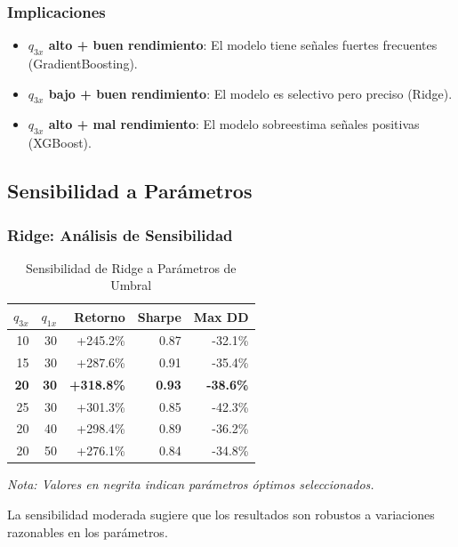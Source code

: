 \subsubsection{Implicaciones}

\begin{itemize}
    \item \textbf{$q_{3x}$ alto + buen rendimiento}: El modelo tiene se\~nales fuertes frecuentes (GradientBoosting).
    \item \textbf{$q_{3x}$ bajo + buen rendimiento}: El modelo es selectivo pero preciso (Ridge).
    \item \textbf{$q_{3x}$ alto + mal rendimiento}: El modelo sobreestima se\~nales positivas (XGBoost).
\end{itemize}

\subsection{Sensibilidad a Par\'ametros}
\label{app:param_sensitivity}

\subsubsection{Ridge: An\'alisis de Sensibilidad}

\begin{table}[htbp]
\centering
\caption{Sensibilidad de Ridge a Par\'ametros de Umbral}
\label{tab:ridge_sensitivity}
\small
\begin{tabular}{@{}rrrrr@{}}
\toprule
\textbf{$q_{3x}$} & \textbf{$q_{1x}$} & \textbf{Retorno} & \textbf{Sharpe} & \textbf{Max DD} \\
\midrule
10 & 30 & +245.2\% & 0.87 & -32.1\% \\
15 & 30 & +287.6\% & 0.91 & -35.4\% \\
\textbf{20} & \textbf{30} & \textbf{+318.8\%} & \textbf{0.93} & \textbf{-38.6\%} \\
25 & 30 & +301.3\% & 0.85 & -42.3\% \\
20 & 40 & +298.4\% & 0.89 & -36.2\% \\
20 & 50 & +276.1\% & 0.84 & -34.8\% \\
\bottomrule
\end{tabular}

\vspace{0.2cm}
\small\textit{Nota: Valores en negrita indican par\'ametros \'optimos seleccionados.}
\end{table}

La sensibilidad moderada sugiere que los resultados son robustos a variaciones razonables en los par\'ametros.

